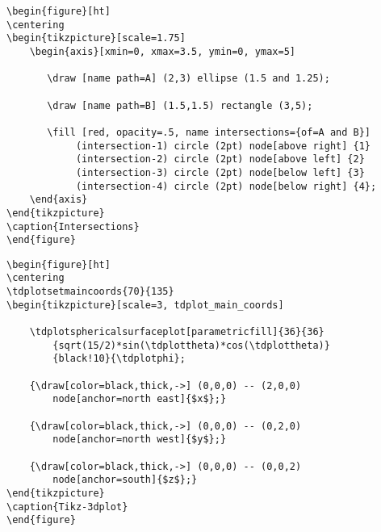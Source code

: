 \newpage
\begin{verbatim}
\begin{figure}[ht]
\centering
\begin{tikzpicture}[scale=1.75]
	\begin{axis}[xmin=0, xmax=3.5, ymin=0, ymax=5]
	   
       \draw [name path=A] (2,3) ellipse (1.5 and 1.25);
	   
       \draw [name path=B] (1.5,1.5) rectangle (3,5);
       
       \fill [red, opacity=.5, name intersections={of=A and B}]
            (intersection-1) circle (2pt) node[above right] {1}
            (intersection-2) circle (2pt) node[above left] {2} 
            (intersection-3) circle (2pt) node[below left] {3} 
            (intersection-4) circle (2pt) node[below right] {4};
	\end{axis}
\end{tikzpicture}
\caption{Intersections}
\end{figure}
\end{verbatim}


\newpage
\begin{verbatim}
\begin{figure}[ht]
\centering
\tdplotsetmaincoords{70}{135}
\begin{tikzpicture}[scale=3, tdplot_main_coords]
    
    \tdplotsphericalsurfaceplot[parametricfill]{36}{36}
        {sqrt(15/2)*sin(\tdplottheta)*cos(\tdplottheta)}
        {black!10}{\tdplotphi};

    {\draw[color=black,thick,->] (0,0,0) -- (2,0,0) 
        node[anchor=north east]{$x$};}

    {\draw[color=black,thick,->] (0,0,0) -- (0,2,0) 
        node[anchor=north west]{$y$};}
    
    {\draw[color=black,thick,->] (0,0,0) -- (0,0,2) 
        node[anchor=south]{$z$};}
\end{tikzpicture}
\caption{Tikz-3dplot}
\end{figure}
\end{verbatim}